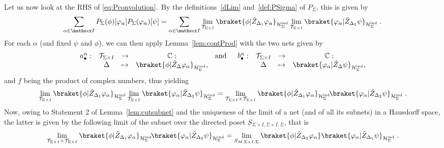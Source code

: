 \documentclass[11pt]{article}
\newcommand{\Hind}{\mathcal{H}_{\Sigma}^{\rm ind}}
\theoremstyle{definition}
\numberwithin{equation}{section}
\begin{document}
\smallskip

Let us now look at the RHS of \eqref{eq:Pconvolution}.~By the definitions~\eqref{dLim} and~\eqref{def:PSigma} of $P_{\Sigma}$, this is given by
\begin{equation}\label{eq:cnovRHS1}
    \sum_{\alpha\in\mathscr I}P_{\Sigma}(\phi)[\varphi_\alpha]P_{\Sigma}(\varphi_\alpha)[\psi]=\sum_{\alpha\in\mathscr I}\lim_{\mathcal T_{\Sigma\times I}}\braket{\phi|\tilde{Z}_{\Delta_{1}}\varphi_{\alpha}}_{\Hind}\lim_{\mathcal T_{\Sigma\times I}}\braket{\varphi_{\alpha}|\tilde{Z}_{\Delta_{2}}\psi}_{\Hind}\;.
\end{equation}
For each $\alpha$ (and fixed $\psi$ and $\phi$), we can then apply Lemma~\ref{lem:contProd} with the two nets given by
\begin{equation}
        \begin{matrix}
            a_{\bullet}^{\alpha}:&\mathcal T_{\Sigma\times I}&\to&\mathbb C\;; & \text{and}\;\; & b_{\bullet}^{\alpha}:&\mathcal T_{\Sigma\times I}&\to&\mathbb C\;;\\
            & \Delta & \mapsto & \braket{\phi|\tilde{Z}_{\Delta}\varphi_{\alpha}}_{\Hind}, & & & \Delta & \mapsto & \braket{\varphi_{\alpha}|\tilde{Z}_{\Delta}\psi}_{\Hind},
        \end{matrix}
\end{equation}
and $f$ being the product of complex numbers, thus yielding
\begin{equation}
    \lim_{\mathcal T_{\Sigma\times I}}\braket{\phi|\tilde{Z}_{\Delta_{1}}\varphi_{\alpha}}_{\Hind}\lim_{\mathcal T_{\Sigma\times I}}\braket{\varphi_{\alpha}|\tilde{Z}_{\Delta_{2}}\psi}_{\Hind}=\lim_{\mathcal T_{\Sigma\times I}\times\mathcal T_{\Sigma\times I}}\braket{\phi|\tilde{Z}_{\Delta_{1}}\varphi_{\alpha}}_{\Hind}\!\braket{\varphi_{\alpha}|\tilde{Z}_{\Delta_{2}}\psi}_{\Hind}\;.
\end{equation}
Now, owing to Statement 2 of Lemma~\ref{lem:cutsubnet} and the uniqueness of the limit of a net (and of all its subnets) in a Hausdorff space, the latter is given by the following limit of the subnet over the directed poset $S_{\Sigma\times I,\Sigma\times I,\Sigma}$, that is
\begin{equation}
    \lim_{\mathcal T_{\Sigma\times I}\times\mathcal T_{\Sigma\times I}}\braket{\phi|\tilde{Z}_{\Delta_{1}}\varphi_{\alpha}}_{\Hind}\!\braket{\varphi_{\alpha}|\tilde{Z}_{\Delta_{2}}\psi}_{\Hind}=\lim_{S_{M,\Sigma\times I,\Sigma}}\braket{\phi|\tilde{Z}_{\Delta_{2}}\varphi_{\alpha}}\braket{\varphi_{\alpha}|\tilde{Z}_{\Delta_{1}}\psi}_{\Hind}\;.
\end{equation}
\end{document}
